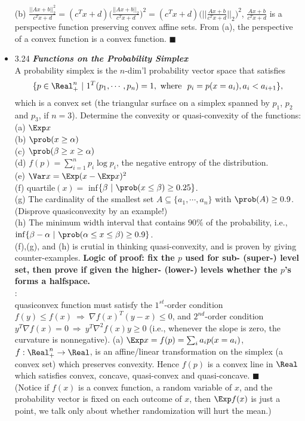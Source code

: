 \begin{itemize}
   (b) $\frac{||Ax + b||_2^2}{c^Tx + d} = (c^Tx + d)\Big(\frac{||Ax + b||_2}{c^Tx + d}\Big)^2 =
(c^Tx + d)\Big(||\frac{Ax + b}{c^Tx + d}||_2\Big)^2 $, $\frac{Ax + b}{c^Tx + d}$ is a perspective
function preserving convex affine sets. From (a), the perspective of a convex function is a convex
function.  $\blacksquare$ \\

\item 3.24 {\bf\emph{Functions on the Probability Simplex}} \\ A probability simplex is the
$n$-dim'l probability vector space that satisfies \begin{equation*} \{ p \in \Real_{+}^n \ | \ 1^T
(p_1,\cdots,p_n) = 1,  \text{\ where \ } p_i=p(x=a_i), a_i<a_{i+1} \}, \end{equation*} which is a
convex set (the triangular surface on a simplex spanned by $p_1$, $p_2$ and $p_3$, if $n=3$).
Determine the convexity or quasi-convexity of the functions: \\ (a) $\Exp x$ \\ (b) $\prob(x \ge
\alpha)$ \\ (c) $\prob(\beta \ge x \ge \alpha)$ \\ (d) $f(p) = \sum_{i=1}^n p_i \log p_i$, the
negative entropy of the distribution. \\ (e) $\Var x = \Exp(x-\Exp x)^2$ \\ {\color{red} (f)
quartile$(x) =$ inf$\{ \beta \ | \  \prob(x \le \beta) \ge 0.25 \}$. \\ (g) The cardinality of the
smallest set $A \subseteq \{a_1,\cdots, a_n \}$ with $\prob(A) \ge 0.9$. (Disprove quasiconvexity by
an example!) \\ (h) The minimum width interval that contains $90\%$ of the probability, i.e., $\inf
\{ \beta - \alpha \ | \ \prob(\alpha \le x \le \beta) \ge 0.9 \}$.  \\ } (f),(g), and (h) is
crutial in thinking quasi-convexity, and is proven by giving counter-examples.  {\bf Logic of proof:
fix the $p$ used for sub- (super-) level set, then prove if given the higher- (lower-) levels
whether the $p$'s forms a halfspace.} \\

   \Proof: \\ quasiconvex function must satisfy the $1^{st}$-order condition $f(y) \le f(x) \
\Rightarrow \ \nabla f(x)^T(y-x) \le 0$, and $2^{nd}$-order condition $y^T\nabla f(x) = 0 \
\Rightarrow \ y^T\nabla^2 f(x) y \ge 0$ (i.e., whenever the slope is zero, the curvature is
nonnegative).  (a) $\Exp x = f(p) = \sum_i a_i p(x=a_i)$, $f: \Real_+^n \rightarrow \Real$, is an
affine/linear transformation on the simplex (a convex set) which preserves convexity.   Hence $f(p)$
is a convex line in $\Real$ which satisfies convex, concave, quasi-convex and quasi-concave.
$\blacksquare$ \\ (Notice if $f(x)$ is a convex function, a random variable of $x$, and the
probability vector is fixed on each outcome of $x$, then $\Exp f(x)$ is just a point, we talk only
about whether randomization will hurt the mean.)


\end{itemize}
